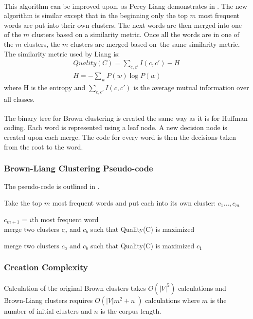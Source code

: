 \paragraph{}
This algorithm can be improved upon, as Percy Liang demonstrates in \cite{Liang2005}. The new algorithm is similar except that in the beginning only the top $m$ most frequent words are put into their own clusters. The next words are then merged into one of the $m$ clusters based on a similarity metric. Once all the words are in one of the $m$ clusters, the $m$ clusters are merged based on~the same similarity metric.
The similarity metric used by Liang is:
\begin{align}
Quality(C) = \sum_{c,c'} I(c,c') - H
\\
H= -\sum_w P(w) \log P(w) \nonumber
\end{align}
where H is the entropy and $\sum_{c,c'} I(c,c')$ is the average mutual information over all classes.
\paragraph{}
The binary tree for Brown clustering is created the same way as it is for Huffman coding. Each word is represented using a leaf node. A new decision node is created upon each merge. The code for every word is then the decisions taken from the root to the word.

\subsubsection{Brown-Liang Clustering Pseudo-code}
The pseudo-code is outlined in \cite{Collins2011}.
\begin{algorithm}
\SetAlgoLined
Take the top $m$ most frequent words and put each into its own cluster: $c_1\dots,c_m$

 {
	$c_{m+1}$ = $i$th most frequent word
	\\
	merge two clusters $c_a$ and $c_b$ such that Quality(C) is maximized
	
}
 {
merge two clusters $c_a$ and $c_b$ such that Quality(C) is maximized
}
\Return $c_1$
\end{algorithm}

\subsubsection{Creation Complexity}
\paragraph{}
Calculation of the original Brown clusters takes $O(|V|^5)$ calculations and Brown-Liang clusters requires $O(|V| m^2+n|)$ calculations where $m$ is the number of initial clusters and $n$ is the corpus length.  

